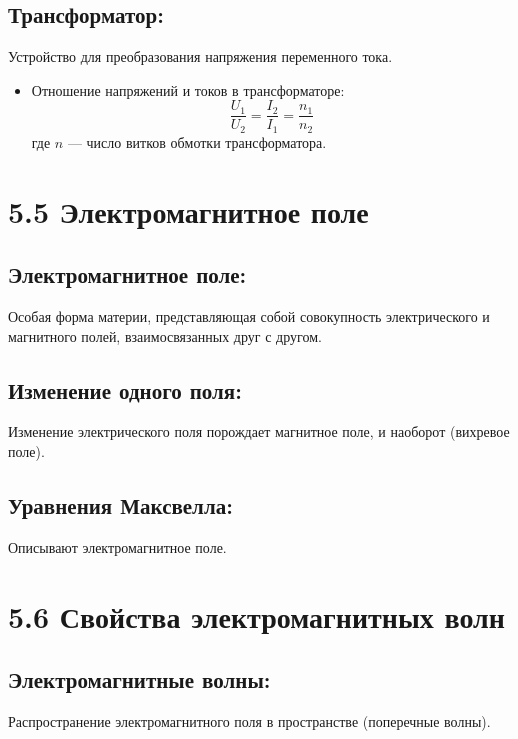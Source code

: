 \documentclass[a4paper,12pt]{article}
\begin{document}
\vspace{-9pt}
\subsection*{Трансформатор:}
\vspace{-3pt}
Устройство для преобразования напряжения переменного тока.
\begin{itemize}
  \item Отношение напряжений и токов в трансформаторе:
  \vspace{-0.05em}
  $$ \frac{U_1}{U_2} = \frac{I_2}{I_1} = \frac{n_1}{n_2} $$
  где $n$ — число витков обмотки трансформатора.
\end{itemize}


\section*{5.5 Электромагнитное поле}
\vspace{-9pt}
\subsection*{Электромагнитное поле:}
\vspace{-3pt}
Особая форма материи, представляющая собой совокупность электрического и магнитного полей, взаимосвязанных друг с другом.

\vspace{-9pt}
\subsection*{Изменение одного поля:}
\vspace{-3pt}
Изменение электрического поля порождает магнитное поле, и наоборот (вихревое поле).

\vspace{-9pt}
\subsection*{Уравнения Максвелла:}
\vspace{-3pt}
Описывают электромагнитное поле.


\section*{5.6 Свойства электромагнитных волн}
\vspace{-9pt}
\subsection*{Электромагнитные волны:}
\vspace{-3pt}
Распространение электромагнитного поля в пространстве (поперечные волны).
\end{document}
